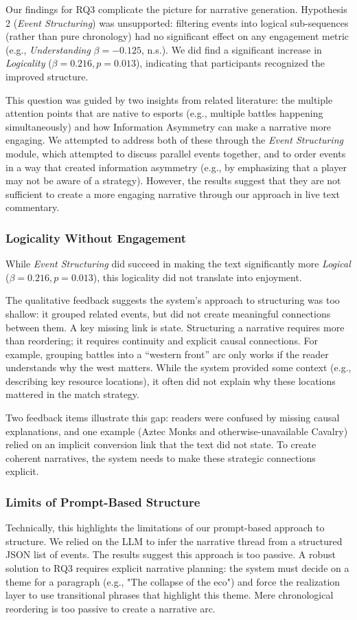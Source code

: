 Our findings for RQ3 complicate the picture for narrative generation. Hypothesis 2 (\textit{Event Structuring}) was unsupported: filtering events into logical sub-sequences (rather than pure chronology) had no significant effect on any engagement metric (e.g., \textit{Understanding} $\beta=-0.125$, n.s.). We did find a significant increase in \textit{Logicality} ($\beta=0.216, p=0.013$), indicating that participants recognized the improved structure.

This question was guided by two insights from related literature: the multiple attention points that are native to esports (e.g., multiple battles happening simultaneously) and how Information Asymmetry can make a narrative more engaging. We attempted to address both of these through the \textit{Event Structuring} module, which attempted to discuss parallel events together, and to order events in a way that created information asymmetry (e.g., by emphasizing that a player may not be aware of a strategy). However, the results suggest that they are not sufficient to create a more engaging narrative through our approach in live text commentary.

\subsubsection{Logicality Without Engagement}
While \textit{Event Structuring} did succeed in making the text significantly more \textit{Logical} ($\beta=0.216, p=0.013$), this logicality did not translate into enjoyment.

The qualitative feedback suggests the system's approach to structuring was too shallow: it grouped related events, but did not create meaningful connections between them. A key missing link is state. Structuring a narrative requires more than reordering; it requires continuity and explicit causal connections. For example, grouping battles into a ``western front'' arc only works if the reader understands why the west matters. While the system provided some context (e.g., describing key resource locations), it often did not explain why these locations mattered in the match strategy.

Two feedback items illustrate this gap: readers were confused by missing causal explanations, and one example (Aztec Monks and otherwise-unavailable Cavalry) relied on an implicit conversion link that the text did not state. To create coherent narratives, the system needs to make these strategic connections explicit.

\subsubsection{Limits of Prompt-Based Structure}
Technically, this highlights the limitations of our prompt-based approach to structure. We relied on the LLM to infer the narrative thread from a structured JSON list of events. The results suggest this approach is too passive. A robust solution to RQ3 requires explicit narrative planning: the system must decide on a theme for a paragraph (e.g., "The collapse of the eco") and force the realization layer to use transitional phrases that highlight this theme. Mere chronological reordering is too passive to create a narrative arc.

